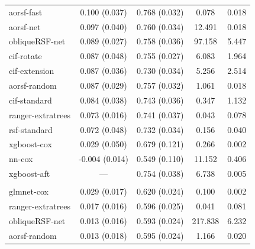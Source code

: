 \documentclass{article}\usepackage[]{graphicx}\usepackage[]{xcolor}
\newenvironment{knitrout}{}{} %
\begin{document}
\begin{knitrout}
\begin{longtable}[t]{lcccc}
\hspace{1em}aorsf-fast & 0.100 (0.037) & 0.768 (0.032) & 0.078 & 0.018\\
\hspace{1em}aorsf-net & 0.097 (0.040) & 0.760 (0.034) & 12.491 & 0.018\\
\hspace{1em}obliqueRSF-net & 0.089 (0.027) & 0.758 (0.036) & 97.158 & 5.447\\
\hspace{1em}cif-rotate & 0.087 (0.048) & 0.755 (0.027) & 6.083 & 1.964\\
\hspace{1em}cif-extension & 0.087 (0.036) & 0.730 (0.034) & 5.256 & 2.514\\
\hspace{1em}aorsf-random & 0.087 (0.029) & 0.757 (0.032) & 1.061 & 0.018\\
\hspace{1em}cif-standard & 0.084 (0.038) & 0.743 (0.036) & 0.347 & 1.132\\
\hspace{1em}ranger-extratrees & 0.073 (0.016) & 0.741 (0.037) & 0.043 & 0.078\\
\hspace{1em}rsf-standard & 0.072 (0.048) & 0.732 (0.034) & 0.156 & 0.040\\
\hspace{1em}xgboost-cox & 0.029 (0.050) & 0.679 (0.121) & 0.266 & 0.002\\
\hspace{1em}nn-cox & -0.004 (0.014) & 0.549 (0.110) & 11.152 & 0.406\\
\hspace{1em}xgboost-aft & --- & 0.754 (0.038) & 6.738 & 0.005\\
\addlinespace[0.3em]
\multicolumn{5}{l}{\textit{\textbf{FCL; relapse, n = 541, p = 7}}}\\
\hline
\hspace{1em}glmnet-cox & 0.029 (0.017) & 0.620 (0.024) & 0.100 & 0.002\\
\hspace{1em}ranger-extratrees & 0.017 (0.016) & 0.596 (0.025) & 0.041 & 0.081\\
\hspace{1em}obliqueRSF-net & 0.013 (0.016) & 0.593 (0.024) & 217.838 & 6.232\\
\hspace{1em}aorsf-random & 0.013 (0.018) & 0.595 (0.024) & 1.166 & 0.020\\

\end{longtable}
\end{knitrout}
\end{document}
